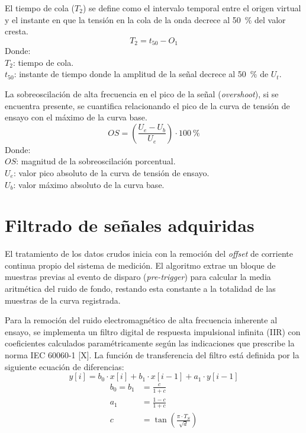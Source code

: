 El tiempo de cola ($T_2$) se define como el intervalo temporal entre el origen virtual y el instante en que la tensión en la cola de la onda decrece al \SI{50}{\percent} del valor cresta.
\begin{equation}
    T_2 = t_{50} - O_1
    \label{eq:T2_calculation}
\end{equation}
Donde:\\
$T_2$: tiempo de cola.\\
$t_{50}$: instante de tiempo donde la amplitud de la señal decrece al \SI{50}{\percent} de $U_t$.

La sobreoscilación de alta frecuencia en el pico de la señal (\textit{overshoot}), si se encuentra presente, se cuantifica relacionando el pico de la curva de tensión de ensayo con el máximo de la curva base.
\begin{equation}
    OS = \left( \frac{U_e - U_b}{U_e} \right) \cdot \SI{100}{\percent}
    \label{eq:OS_calculation}
\end{equation}
Donde:\\
$OS$: magnitud de la sobreoscilación porcentual.\\
$U_e$: valor pico absoluto de la curva de tensión de ensayo.\\
$U_b$: valor máximo absoluto de la curva base.

\section{Filtrado de señales adquiridas}
El tratamiento de los datos crudos inicia con la remoción del \textit{offset} de corriente continua propio del sistema de medición. El algoritmo extrae un bloque de muestras previas al evento de disparo (\textit{pre-trigger}) para calcular la media aritmética del ruido de fondo, restando esta constante a la totalidad de las muestras de la curva registrada.

Para la remoción del ruido electromagnético de alta frecuencia inherente al ensayo, se implementa un filtro digital de respuesta impulsional infinita (IIR) con coeficientes calculados paramétricamente según las indicaciones que prescribe la norma IEC 60060-1 [X]. La función de transferencia del filtro está definida por la siguiente ecuación de diferencias:
\begin{equation}
    y[i] = b_0 \cdot x[i] + b_1 \cdot x[i-1] + a_1 \cdot y[i-1]
    \label{eq:ecuacion_filtro}
\end{equation}
\begin{align*}
    b_0 = b_1 &= \frac{c}{1+c}\\
    a_1 &= \frac{1-c}{1+c}\\
    c &= \tan\left(\frac{\pi \cdot T_S}{\sqrt{d}}\right)
\end{align*}

